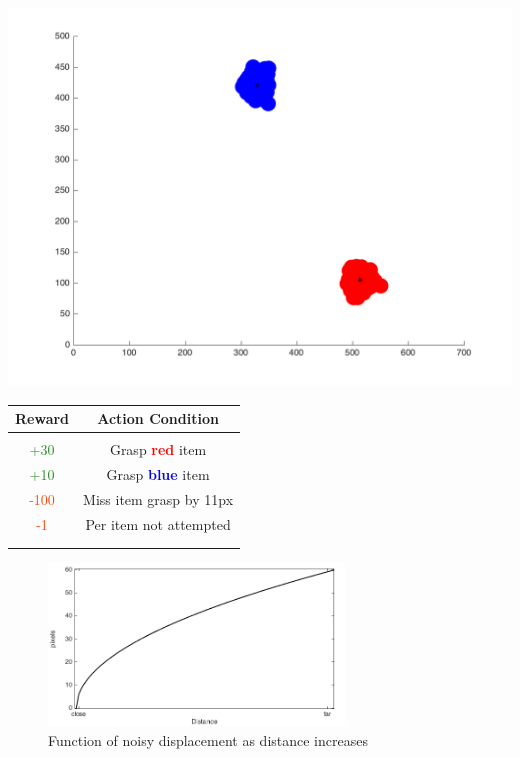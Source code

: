 \documentclass[11]{article}
\begin{document}
  \begin{minipage}[b]{0.44\textwidth}
    \includegraphics[width=1\textwidth]{figures/Scene.png}
    \label{fig:scene}
  \end{minipage}
  \hfill
  \begin{minipage}[b]{0.55\textwidth}
    \centering
    \begin{tabular}{cc}\hline
        \textbf{Reward} & \textbf{Action Condition}\\ \hline
	\\        
        \textcolor{ForestGreen}{+30} & Grasp \textbf{\textcolor{red}{red}} item \\
        \textcolor{ForestGreen}{+10} & Grasp \textbf{\textcolor{blue}{blue}} item \\
        \textcolor{OrangeRed}{-100} & Miss item grasp by 11px \\
        \textcolor{OrangeRed}{-1} & Per item not attempted \\
	\\
        \hline
        \\
        
      \end{tabular}
      \label{table:rewards}
    \end{minipage}

\begin{figure}[h]
	\centering
	\includegraphics[width=0.7\textwidth]{figures/Noise.png}
	\caption{Function of noisy displacement as distance increases}
	\label{fig:noise}
\end{figure}
\end{document}

